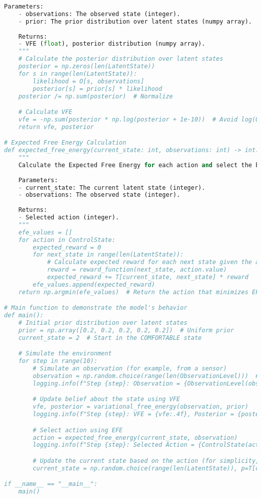 \documentclass[11pt,a4paper]{article}
\begin{document}
\begin{lstlisting}[language=Python, caption={Implementation code for the POMDP with Active Inference}]
    Parameters:
    - observations: The observed state (integer).
    - prior: The prior distribution over latent states (numpy array).
    
    Returns:
    - VFE (float), posterior distribution (numpy array).
    """
    # Calculate the posterior distribution over latent states
    posterior = np.zeros(len(LatentState))
    for s in range(len(LatentState)):
        likelihood = O[s, observations]
        posterior[s] = prior[s] * likelihood
    posterior /= np.sum(posterior)  # Normalize

    # Calculate VFE
    vfe = -np.sum(posterior * np.log(posterior + 1e-10))  # Avoid log(0)
    return vfe, posterior

# Expected Free Energy Calculation
def expected_free_energy(current_state: int, observations: int) -> int:
    """
    Calculate the Expected Free Energy for each action and select the best action.
    
    Parameters:
    - current_state: The current latent state (integer).
    - observations: The observed state (integer).
    
    Returns:
    - Selected action (integer).
    """
    efe_values = []
    for action in ControlState:
        expected_reward = 0
        for next_state in range(len(LatentState)):
            # Calculate expected reward for each next state given the action
            reward = reward_function(next_state, action.value)
            expected_reward += T[current_state, next_state] * reward
        efe_values.append(expected_reward)
    return np.argmin(efe_values)  # Return the action that minimizes EFE

# Main function to demonstrate the model's behavior
def main():
    # Initial prior distribution over latent states
    prior = np.array([0.2, 0.2, 0.2, 0.2, 0.2])  # Uniform prior
    current_state = 2  # Start in the COMFORTABLE state

    # Simulate the environment
    for step in range(10):
        # Simulate an observation (for example, from a sensor)
        observation = np.random.choice(range(len(ObservationLevel)))  # Random observation
        logging.info(f"Step {step}: Observation = {ObservationLevel(observation).name}")

        # Update belief about the state using VFE
        vfe, posterior = variational_free_energy(observation, prior)
        logging.info(f"Step {step}: VFE = {vfe:.4f}, Posterior = {posterior}")

        # Select action using EFE
        action = expected_free_energy(current_state, observation)
        logging.info(f"Step {step}: Selected Action = {ControlState(action).name}")

        # Update the current state based on the action (for simplicity, assume deterministic)
        current_state = np.random.choice(range(len(LatentState)), p=T[current_state])

if __name__ == "__main__":
    main()
\end{lstlisting}
\end{document}
